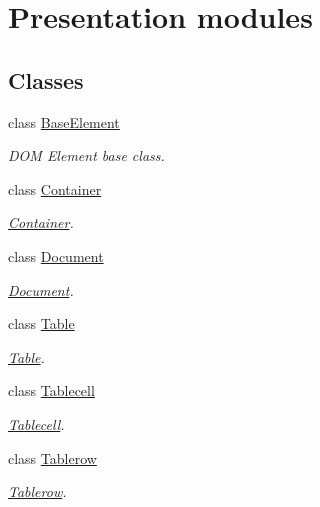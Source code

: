 \section{Presentation modules}
\label{group__OWL__UI__LAYER}
\subsection*{Classes}
\begin{DoxyCompactItemize}
\item 
class \hyperlink{classBaseElement}{BaseElement}
\begin{DoxyCompactList}\small\item\em DOM Element base class. \item\end{DoxyCompactList}\item 
class \hyperlink{classContainer}{Container}
\begin{DoxyCompactList}\small\item\em \hyperlink{classContainer}{Container}. \item\end{DoxyCompactList}\item 
class \hyperlink{classDocument}{Document}
\begin{DoxyCompactList}\small\item\em \hyperlink{classDocument}{Document}. \item\end{DoxyCompactList}\item 
class \hyperlink{classTable}{Table}
\begin{DoxyCompactList}\small\item\em \hyperlink{classTable}{Table}. \item\end{DoxyCompactList}\item 
class \hyperlink{classTablecell}{Tablecell}
\begin{DoxyCompactList}\small\item\em \hyperlink{classTablecell}{Tablecell}. \item\end{DoxyCompactList}\item 
class \hyperlink{classTablerow}{Tablerow}
\begin{DoxyCompactList}\small\item\em \hyperlink{classTablerow}{Tablerow}. \item\end{DoxyCompactList}\end{DoxyCompactItemize}
